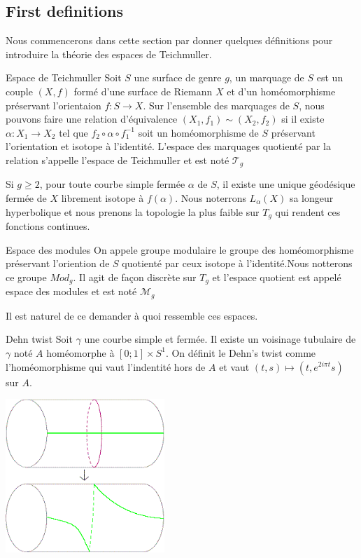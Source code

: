 \subsection{First definitions}

Nous commencerons dans cette section par donner quelques définitions pour introduire la théorie des espaces de Teichmuller.

\begin{dfnt}{Espace de Teichmuller}
Soit $S$ une surface de genre $g$, un marquage de $S$ est un couple $(X,f)$ formé d'une surface de Riemann $X$ et d'un homéomorphisme préservant l'orientaion $f:S \to X$.
Sur l'ensemble des marquages de $S$, nous pouvons faire une relation d'équivalence $(X_1,f_1) \sim (X_2,f_2)$ si il existe $\alpha : X_1 \to X_2 $ tel que $f_2 \circ \alpha \circ f_1^{-1}$ soit un homéomorphisme de $S$ préservant l'orientation et isotope à l'identité.
L'espace des marquages quotienté par la relation s'appelle l'espace de Teichmuller et est noté $\mathcal{T}_g$
\end{dfnt}

\begin{rmq}
Si $g \geq 2$, pour toute courbe simple fermée $\alpha$ de $S$, il existe une unique géodésique fermée de $X$ librement isotope à $f(\alpha)$. Nous noterrons $L_{\alpha}(X)$ sa longeur hyperbolique et nous prenons la topologie la plus faible sur $T_g$ qui rendent ces fonctions continues.
\end{rmq}

\begin{dfnt}{Espace des modules}
On appele groupe modulaire le groupe des homéomorphisme préservant l'oriention de $S$ quotienté par ceux isotope à l'identité.Nous notterons ce groupe $Mod_g$.
Il agit de façon discrète sur $T_g$ et l'espace quotient est appelé espace des modules et est noté $\mathcal{M}_g$
\end{dfnt}

Il est naturel de ce demander à quoi ressemble ces espaces.

\begin{dfnt}{Dehn twist}
Soit $\gamma$ une courbe simple et fermée. Il existe un voisinage tubulaire de $\gamma$ noté $A$ homéomorphe à $[0;1] \times S^{1}$.
On définit le Dehn's twist comme l'homéomorphisme qui vaut l'indentité hors de $A$ et vaut $(t,s) \mapsto (t,e^{2i \pi t} s)$ sur $A$.
\end{dfnt}

\begin{center}
\includegraphics[width=6cm]{Image/Dehn_twist.png}
\end{center}

